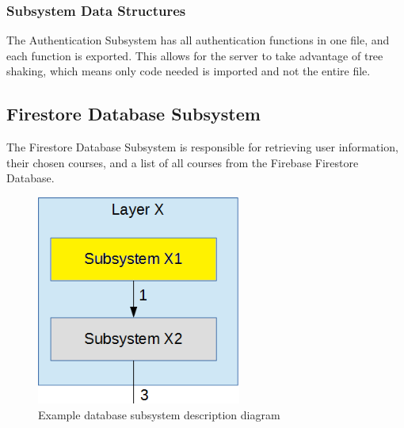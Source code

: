 \subsubsection{Subsystem Data Structures}
The Authentication Subsystem has all authentication functions in one file, and each function is exported. This allows for the server to take advantage of tree shaking, which means only code needed is imported and not the entire file.


\subsection{Firestore Database Subsystem}
The Firestore Database Subsystem is responsible for retrieving user information, their chosen courses, and a list of all courses from the Firebase Firestore Database.

\begin{figure}[h!]
	\centering
	\includegraphics[width=0.60\textwidth]{images/subsystem} %
	\caption{Example database subsystem description diagram} %
\end{figure}

